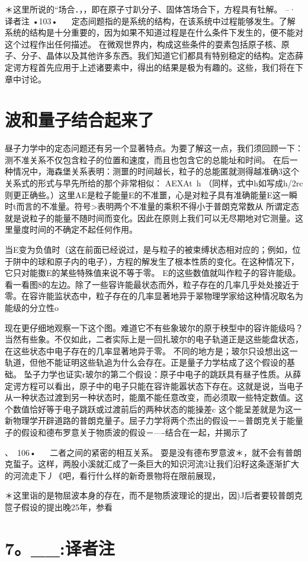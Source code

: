＊这里所说的“场合．，，即在原子寸趴分子、固体笘场合下，方程具有牡解。
--·译者注
•103•
  
定态间题指的是系统的结构，在该系统中过程能够发生。了解系统的结构是十分重要的，因为如果不知道过程是在什么条件下发生的，便不能对这个过程作出任何描述。
在微观世界内，构成这些条件的耍素包括原子核、原子、分子、晶体以及其他许多东西。我们知道它们都具有特别稳定的结构。定态薛定谔方程首先应用于上述诸要素中，得出的结果是极为有趣的。这些，我们将在下章中讨论。

\section{波和量子结合起来了}

昼子力学中的定态问题还有另一个显著特点。为要了解这一点，我们须回顾一下：测不准关系不仅包含粒子的位置和速度，而且也包含它的总能址和时间。
在后一种情况中，海森堡关系表明：测噩的时间越长，粒子的总能匿就测得越准确3这个关系式的形式与早先所给的那个非常相似：
AEXAt~h
（同样，式中h如写成h/2rc则更正确些。）这里AE是粒子能量E的不准噩，心是对粒子具有准确能量E这一瞬时t而言的不准量。符号>表明两个不准量的乘积不得小于普朗克常数从
所谓定态就是说粒子的能量不随时间而变化。因此在原则上我们可以无尽期地对它测量。这里量度时间的不确定不起任何作用。

当E变为负值时（这在前面已经说过，是与粒子的被束缚状态相对应的；例如，位于阱中的球和原子内的电子），方程的解发生了根本性质的变化。在这种情况下，它只对能擞E的某些特殊值来说不等于零。
E的这些数值就叫作粒子的容许能级。看一看图8的左边。除了一些容许能最状态而外，粒子存在的几率几乎处处接近于零。在容许能监状态中，粒子存在的几率显著地异于翠物理学家给这种情况取名为能级的分立性o

现在更仔细地观察一下这个图。难道它不有些象玻尔的原于秧型中的容许能级吗？当然有些象。不仅如此，二者实际上是一回扎玻尔的电子轨道正是这些能盘状态，在这些状态中电子存在的几率显著地异于零。
不同的地方是；玻尔只设想出这一轨道，但他不能证明这些轨追为什么会存在。正是量子力学枯成了这个假设的基础。
坠子力学也证实r玻尔的第二个假设：原子中电子的跳跃具有昼子性质。从薛定谔方程可以看出，原子中的电子只能在容许能嚣状态下存在。这就是说，当电子从一种状态过渡到另一种状态时，能凰不能任意改变，而必须取一些特定数值。这个数值恰好等于电子跳跃或过渡前后的两种状态的能操差c
这个能呈差就是为这一新物理学开辟道路的普朗克量子。屈子力学将两个杰出的假设一－普朗克关于能量子的假设和德布罗意关于物质波的假设－—-结合在一起，并揭示了

、~106•
  
二者之间的紧密的相互关系。
耍是没有德布罗意波＊，就不会有普朗克蜇子。这样，两股小溪就汇成了一条巨大的知识河流3让我们沿籽这条逐渐扩大的河流走下丿《吧，看行什么样的新奇景物将在限前展现，

＊这里诣的是物屈波本身的存在，而不是物质波理论的提出，因)J后者要较普朗克笸子假设的提出晚25年，参看\section{7。__:译者注}

